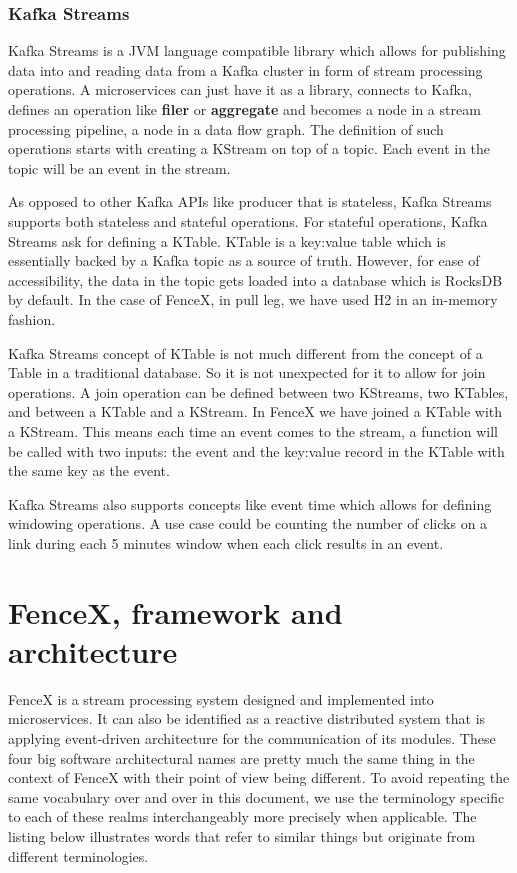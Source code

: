 \documentclass[a4]{report}
\begin{document}
    \subsection{Kafka Streams}
    Kafka Streams\cite{KafkaStreamsJoins} is a JVM language compatible library which allows for publishing
    data into and reading data from a Kafka cluster in form of stream processing operations.
    A microservices can just have it as a library, connects to Kafka, defines an operation like \textbf{filer} or
    \textbf{aggregate} and becomes a node in a stream processing pipeline, a node in a data flow graph.
    The definition of such operations starts with creating a KStream on top of a topic.
    Each event in the topic will be an event in the stream.

    As opposed to other Kafka APIs like producer that is stateless, Kafka Streams supports both stateless and
    stateful operations.
    For stateful operations, Kafka Streams ask for defining a KTable.
    KTable is a key:value table which is essentially backed by a Kafka topic as a source of truth.
    However, for ease of accessibility, the data in the topic gets loaded into a database which is RocksDB by default.
    In the case of FenceX, in pull leg, we have used H2 in an in-memory fashion.

    Kafka Streams concept of KTable is not much different from the concept of a Table in a traditional database.
    So it is not unexpected for it to allow for join operations.
    A join operation can be defined between two KStreams, two KTables, and between a KTable and a KStream.
    In FenceX we have joined a KTable with a KStream.
    This means each time an event comes to the stream, a function will be called with two inputs: the event and the key:value record in the KTable with the same key as the event.

    Kafka Streams also supports concepts like event time which allows for defining windowing operations.
    A use case could be counting the number of clicks on a link during each 5 minutes window when each click results in an event.


    \chapter{FenceX, framework and architecture}
    FenceX is a stream processing system designed and implemented into microservices.
    It can also be identified as a reactive distributed system that is applying event-driven architecture for the communication of its modules.
    These four big software architectural names are pretty much the same thing in the context of FenceX with their point of view being different.
    To avoid repeating the same vocabulary over and over in this document, we use the terminology specific to each of
    these realms interchangeably more precisely when applicable.
    The listing below illustrates words that refer to similar things but originate from different terminologies.
\end{document}
